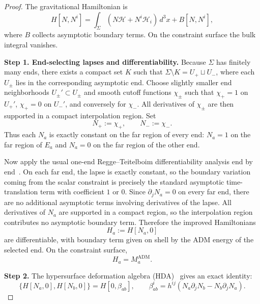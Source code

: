 \documentclass[aps,prd,onecolumn,nofootinbib,superscriptaddress]{revtex4-2}
\begin{document}
\begin{proof}
The gravitational Hamiltonian is
\begin{equation}
  H[N,N^i] = \int_\Sigma(N\mathcal{H}+N^i\mathcal{H}_i)\,d^3x + B[N,N^i],
\end{equation}
where $B$ collects asymptotic boundary terms.  On the constraint surface the
bulk integral vanishes.

\textbf{Step 1. End-selecting lapses and differentiability.} Because $\Sigma$
has finitely many ends, there exists a compact set $K$ such that
$\Sigma\setminus K = U_+ \sqcup U_-$, where each $U_\pm$ lies in the
corresponding asymptotic end. Choose slightly smaller end neighborhoods
$U_\pm' \subset U_\pm$ and smooth cutoff functions $\chi_\pm$ such that
$\chi_+=1$ on $U_+'$, $\chi_+=0$ on $U_-'$, and conversely for $\chi_-$. All
derivatives of $\chi_\pm$ are then supported in a compact interpolation region.
Set
\begin{equation}
  N_+ := \chi_+,\qquad N_- := \chi_-.
\end{equation}
Thus each $N_a$ is exactly constant on the far region of every end:
$N_a=1$ on the far region of $E_a$ and $N_a=0$ on the far region of the other
end.

Now apply the usual one-end Regge--Teitelboim differentiability analysis end
by end~\cite{ReggeTeitelboim1974SurfaceIntegrals,Bartnik1986Mass}. On each far end, the lapse is
exactly constant, so the boundary variation coming from the scalar constraint
is precisely the standard asymptotic time-translation term with coefficient $1$
or $0$. Since $\partial_j N_a=0$ on every far end, there are no additional
asymptotic terms involving derivatives of the lapse. All derivatives of $N_a$
are supported in a compact region, so the interpolation region contributes no
asymptotic boundary term. Therefore the improved Hamiltonians
\begin{equation}
  H_a := H[N_a,0]
\end{equation}
are differentiable, with boundary term given on shell by the ADM energy of the
selected end. On the constraint surface,
\begin{equation}
  H_a = M_a^{\mathrm{ADM}}.
\end{equation}

\textbf{Step 2.} The hypersurface deformation algebra
(HDA)~\cite{HojmanKucharTeitelboim1976Geometrodynamics} gives an exact identity:
\begin{equation}
\label{eq:HDA}
  \{H[N_a,0],H[N_b,0]\} = H[0,\beta_{ab}],\qquad
  \beta_{ab}^i = h^{ij}(N_a\partial_jN_b-N_b\partial_jN_a).
\end{equation}


\end{proof}
\end{document}
